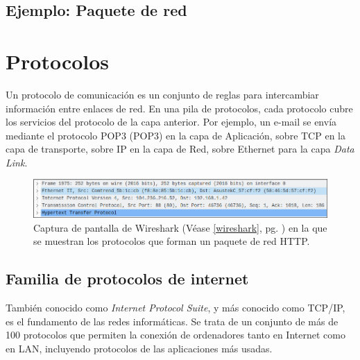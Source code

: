 \documentclass[a4paper, 11pt]{report} %
\newcommand{\acr}[1]{\acrshort{#1} (\acrlong{#1})}
\begin{document}
\subsection{Ejemplo: Paquete de red}

\section{Protocolos}
Un protocolo de comunicación es un conjunto de reglas para intercambiar información entre enlaces de red. En una pila de protocolos, cada protocolo cubre los servicios del protocolo de la capa anterior. Por ejemplo, un e-mail se envía mediante el protocolo \acr{POP3} en la capa de Aplicación, sobre TCP en la capa de transporte, sobre IP en la capa de Red, sobre Ethernet para la capa \textit{Data Link}. 
\begin{figure}[H]
\noindent
\includegraphics[width=\textwidth]{Resources/Wireshark01.png}
\caption[Captura de pantalla de Wireshark]{Captura de pantalla de Wireshark (Véase \ref{wireshark}, pg. \pageref{wireshark}) en la que se muestran los protocolos que forman un paquete de red HTTP.}
\end{figure}

\subsection{Familia de protocolos de internet}
También conocido como \textit{Internet Protocol Suite}, y más conocido como TCP/IP, es el fundamento de las redes informáticas. Se trata de un conjunto de más de 100 protocolos que permiten la conexión de ordenadores tanto en Internet como en LAN, incluyendo protocolos de las aplicaciones más usadas.
\end{document}

